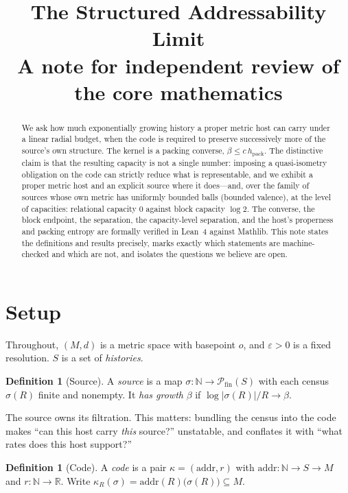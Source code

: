 \documentclass[11pt,a4paper]{article}
\title{The Structured Addressability Limit\\
\large A note for independent review of the core mathematics}
\author{}
\date{}
\theoremstyle{plain}
\theoremstyle{definition}
\newtheorem{definition}[theorem]{Definition}
\theoremstyle{remark}
\newcommand{\hpack}{h_{\mathrm{pack}}}
\begin{document}
\maketitle

\begin{abstract}
We ask how much exponentially growing history a proper metric host can carry
under a linear radial budget, when the code is required to preserve
successively more of the source's own structure. The kernel is a packing
converse, $\beta \le c\,\hpack$. The distinctive claim is that the resulting
capacity is not a single number: imposing a quasi-isometry obligation on the
code can strictly reduce what is representable, and we exhibit a proper metric
host and an explicit source where it does---and, over the family of sources
whose own metric has uniformly bounded balls (bounded valence), at the level of
capacities: relational capacity $0$ against block capacity $\log 2$. The
converse, the block endpoint, the separation, the capacity-level separation,
and the host's properness and packing entropy are formally verified in Lean~4
against Mathlib. This note
states the definitions and results precisely, marks exactly which statements
are machine-checked and which are not, and isolates the questions we believe
are open.
\end{abstract}

\section{Setup}

Throughout, $(M,d)$ is a metric space with basepoint $o$, and $\varepsilon>0$ is
a fixed resolution. $S$ is a set of \emph{histories}.

\begin{definition}[Source]
A \emph{source} is a map $\sigma:\mathbb{N}\to\mathcal{P}_{\mathrm{fin}}(S)$
with each census $\sigma(R)$ finite and nonempty. It \emph{has growth} $\beta$
if $\log|\sigma(R)|/R \to \beta$.
\end{definition}

The source owns its filtration. This matters: bundling the census into the code
makes ``can this host carry \emph{this} source?'' unstatable, and conflates it
with ``what rates does this host support?''

\begin{definition}[Code]
A \emph{code} is a pair $\kappa=(\mathrm{addr},r)$ with
$\mathrm{addr}:\mathbb{N}\to S\to M$ and $r:\mathbb{N}\to\mathbb{R}$.
Write $\kappa_R(\sigma) = \mathrm{addr}(R)\bigl(\sigma(R)\bigr)\subseteq M$.
\end{definition}
\end{document}
